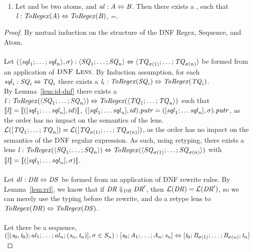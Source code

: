 \begin{lemma}
\begin{enumerate}
\item Let \Atom{} and \AtomAlt{} be two atoms, and $\mathit{al} : \mathit{A} \Leftrightarrow \mathit{B}$.  Then there exists a \Lens{}, such that $\mathit{l} : \mathit{ToRegex}(\mathit{A}) \Leftrightarrow \mathit{ToRegex}(\mathit{B})$, \SemanticsOf{\Lens}=\SemanticsOf{\AtomLens}.
\end{enumerate}
\begin{proof}
By mutual induction on the structure of the DNF Regex, Sequence, and Atom.\\
\\
Let $(\langle\mathit{sql}_1;\ldots;\mathit{sql}_n\rangle,\sigma) : \langle\mathit{SQ}_1;\ldots;\mathit{SQ}_n\rangle \Leftrightarrow \langle\mathit{TQ}_{\sigma(1)};\ldots;\mathit{TQ}_{\sigma(n)}\rangle$ be formed from an application of $\textsc{DNF Lens}$.
By Induction assumption, for each $\mathit{sql}_i : \mathit{SQ}_i \Leftrightarrow \mathit{TQ}_i$ there exists a $\mathit{l}_i : \mathit{ToRegex}(\mathit{SQ}_i) \Leftrightarrow \mathit{ToRegex}(\mathit{TQ}_i)$.\\
By Lemma~\ref{lem:id-dnf} there exists a $\mathit{l} : \mathit{ToRegex}(\langle\mathit{SQ}_1;\ldots;\mathit{SQ}_{n}\rangle) \Leftrightarrow \mathit{ToRegex}(\langle\mathit{TQ}_1;\ldots;\mathit{TQ}_{n}\rangle)$ such that $[ \! [\mathit{l}] \! ]=[ \! [([\mathit{sql}_1;\ldots\mathit{sql}_n],id)] \! ]$,
$([\mathit{sql}_1;\ldots\mathit{sql}_n],id).\mathit{putr}=([\mathit{sql}_1;\ldots\mathit{sql}_n],\sigma).\mathit{putr}$, as the order has no impact on the semantics of the lens.
$\mathcal{L}([\mathit{TQ}_1;\ldots;\mathit{TQ}_n])=\mathcal{L}([\mathit{TQ}_{\sigma(1)};\ldots;\mathit{TQ}_{\sigma(n)}])$, as the order has no impact on the semantics of the DNF regular expression.
As such, using retyping, there exists a lens
$\mathit{l}:\mathit{ToRegex}(\langle\mathit{SQ}_1;\ldots;\mathit{SQ}_n\rangle) \Leftrightarrow \mathit{ToRegex}(\langle\mathit{SQ}_{\sigma(1)};\ldots;\mathit{SQ}_{\sigma(n)}\rangle)$
with
$[ \! [\mathit{l}] \! ]=[ \! [([\mathit{sql}_1;\ldots\mathit{sql}_n],\sigma)] \! ]$.\\
\\
Let $\mathit{dl} : \mathit{DR} \Leftrightarrow \mathit{DS}$ be formed from
an application of DNF rewrite rules.  By Lemma~\ref{lem:rrl},
we know that if $\mathit{DR}\Downarrow_{\mathit{DR}}\mathit{DR}'$, then
$\mathcal{L}(\mathit{DR})=\mathcal{L}(\mathit{DR}')$,
so we can merely use the typing before the rewrite, and do a retype lens to
$\mathit{ToRegex}(\mathit{DR}) \Leftrightarrow \mathit{ToRegex}(\mathit{DS})$.\\
\\
Let there be a sequence, $([(\mathit{s}_0,\mathit{t}_0);\mathit{al}_1;\ldots;\mathit{al}_n;(\mathit{s}_n,\mathit{t}_n)],\sigma \in S_n) : [\mathit{s}_0 ; \mathit{A}_1 ; \ldots ; \mathit{A}_n ; \mathit{s}_n] \Leftrightarrow [\mathit{t}_0; \mathit{B}_{\sigma(1)} ; \ldots ; \mathit{B}_{\sigma(n)} ; \mathit{t}_n]$

\end{proof}
\end{lemma}
